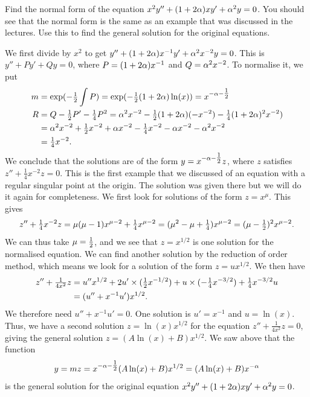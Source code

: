 \documentclass[a4paper]{amsart}
\begin{document}
\begin{exercise}\label{ex-normal-a}
 Find the normal form of the equation $x^2y''+(1+2\alpha)xy'+\alpha^2y=0$.
 You should see that the normal form is the same as an example that
 was discussed in the lectures.  Use this to find the general solution
 for the original equations.
\end{exercise}
\begin{solution}
 We first divide by $x^2$ to get
 $y''+(1+2\alpha)x^{-1}y'+\alpha^2x^{-2}y=0$.  This is $y''+Py'+Qy=0$, where
 $P=(1+2\alpha)x^{-1}$ and $Q=\alpha^2x^{-2}$.  To normalise it, we put 
 \begin{align*}
  m &= \exp(-\tfrac{1}{2}\int P) = \exp(-\tfrac{1}{2}(1+2\alpha)\ln(x)) = x^{-\alpha-\tfrac{1}{2}} \\
  R &= Q - \tfrac{1}{2} P' - \tfrac{1}{4}P^2
     = \alpha^2 x^{-2} - \tfrac{1}{2}(1+2\alpha)(-x^{-2}) - \tfrac{1}{4}(1+2\alpha)^2x^{-2})\\
    &= \alpha^2 x^{-2} + \tfrac{1}{2} x^{-2} + \alpha x^{-2} - \tfrac{1}{4}x^{-2} 
       - \alpha x^{-2} - \alpha^2 x^{-2} \\
    &= \tfrac{1}{4} x^{-2}.
 \end{align*}
 We conclude that the solutions are of the form $y=x^{-\alpha-\tfrac{1}{2}}z$,
 where $z$ satisfies $z''+\tfrac{1}{4}x^{-2}z=0$.  This is the first
 example that we discussed of an equation with a regular singular
 point at the origin.  The solution was given there but we will do it
 again for completeness.  We first look for solutions of the form
 $z=x^\mu$.  This gives 
 \[ z''+\tfrac{1}{4}x^{-2}z = \mu(\mu-1)x^{\mu-2}+\tfrac{1}{4}x^{\mu-2}
     = (\mu^2-\mu+\tfrac{1}{4})x^{\mu-2} = (\mu-\tfrac{1}{2})^2x^{\mu-2}.
 \]
 We can thus take $\mu=\tfrac{1}{2}$, and we see that $z=x^{1/2}$ is one
 solution for the normalised equation.  We can find another solution
 by the reduction of order method, which means we look for a solution
 of the form $z=u x^{1/2}$.  We then have
 \begin{align*}
  z''+\tfrac{1}{4x^2}z &= 
   u''x^{1/2} + 2u'\times(\tfrac{1}{2} x^{-1/2}) + u \times (-\tfrac{1}{4}x^{-3/2})
    + \tfrac{1}{4}x^{-3/2}u \\
  &= (u''+x^{-1}u')x^{1/2}.
 \end{align*}
 We therefore need $u''+x^{-1}u'=0$.  One solution is $u'=x^{-1}$ and
 $u=\ln(x)$.  Thus, we have a second solution $z=\ln(x)x^{1/2}$ for
 the equation $z''+\frac{1}{4x^2}z=0$, giving the general solution
 $z=(A\ln(x)+B)x^{1/2}$.  We saw above that the function 
 \[ y = mz = x^{-\alpha-\tfrac{1}{2}}(A\ln(x)+B)x^{1/2} = (A\ln(x)+B)x^{-\alpha} \]
 is the general solution for the original equation
 $x^2y''+(1+2\alpha)xy'+\alpha^2y=0$.  
\end{solution}
\end{document}
